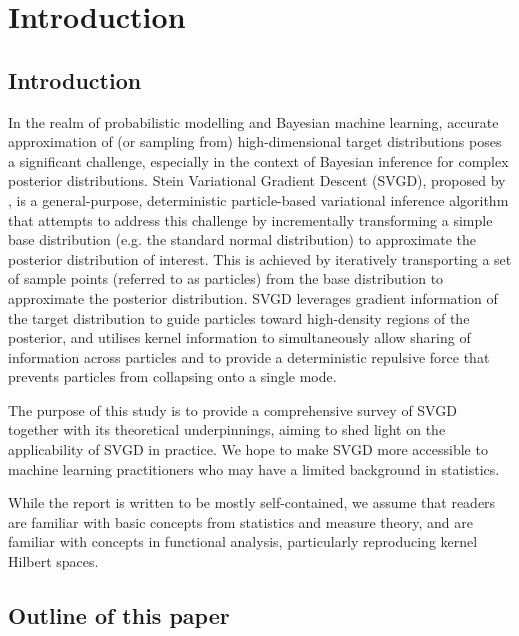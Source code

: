 \chapter{Introduction}

\section{Introduction}

In the realm of probabilistic modelling and Bayesian machine learning, accurate approximation of (or sampling from) high-dimensional target distributions poses a significant challenge, especially in the context of Bayesian inference for complex posterior distributions. Stein Variational Gradient Descent (SVGD), proposed by \citet{liu_svgd}, is a general-purpose, deterministic particle-based variational inference algorithm that attempts to address this challenge by incrementally transforming a simple base distribution (e.g. the standard normal distribution) to approximate the posterior distribution of interest. This is achieved by iteratively transporting a set of sample points (referred to as particles) from the base distribution to approximate the posterior distribution. SVGD leverages gradient information of the target distribution to guide particles toward high-density regions of the posterior, and utilises kernel information to simultaneously allow sharing of information across particles and to provide a deterministic repulsive force that prevents particles from collapsing onto a single mode.

The purpose of this study is to provide a comprehensive survey of SVGD together with its theoretical underpinnings, aiming to shed light on the applicability of SVGD in practice. We hope to make SVGD more accessible to machine learning practitioners who may have a limited background in statistics. 

While the report is written to be mostly self-contained, we assume that readers are familiar with basic concepts from statistics and measure theory, and are familiar with concepts in functional analysis, particularly reproducing kernel Hilbert spaces.

\section{Outline of this paper}

